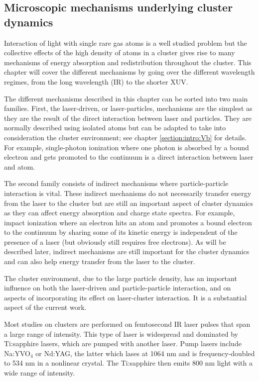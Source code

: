 \subsection{Microscopic mechanisms underlying cluster dynamics}
\label{section:intro:mechanisms}

Interaction of light with single rare gas atoms is a well studied problem but
the collective effects of the high density of atoms in a cluster gives rise to
many mechanisms of energy absorption and redistribution throughout the
cluster. This chapter will cover the different mechanisms by going over the
different wavelength regimes, from the long wavelength (IR) to the shorter XUV.

The different mechanisms described in this chapter can be sorted into two main
families. First, the laser-driven, or laser-particles, mechanisms are the
simplest as they are the result of the direct interaction between laser
and particles. They are normally described using isolated atoms but can
be adapted to take into consideration the cluster environment; see chapter
\ref{section:intro:Vb} for details. For example, single-photon ionization where
one photon is absorbed by a bound electron and gets promoted to the continuum is
a direct interaction between laser and atom.

The second family consists of indirect mechanisms where particle-particle
interaction is vital. These indirect mechanisms do not necessarily transfer
energy from the laser to the cluster but are still an important aspect of
cluster dynamics as they can affect energy absorption and charge state spectra.
For example, impact ionization where
an electron hits an atom and promotes a bound electron to the continuum by
sharing some of its kinetic energy is independent of the presence of a laser
(but obviously still requires free electrons). As will be described later,
indirect mechanisms are still important for the cluster dynamics and can also
help energy transfer from the laser to the cluster.

The cluster environment, due to the large particle density, has an important
influence on both the laser-driven and particle-particle interaction, and
on aspects of incorporating its effect on laser-cluster interaction.
It is a substantial aspect of the current work.

Most studies on clusters are performed on femtosecond IR laser
pulses that span a large range of intensity. This type of laser is
widespread and dominated by Ti:sapphire lasers, which are pumped with another laser.
Pump lasers include Na:YVO$_4$ or Nd:YAG, the latter which lases at 1064 nm and is
frequency-doubled to 534 nm in a nonlinear crystal. The Ti:sapphire then emits
800 nm light with a wide range of intensity.

